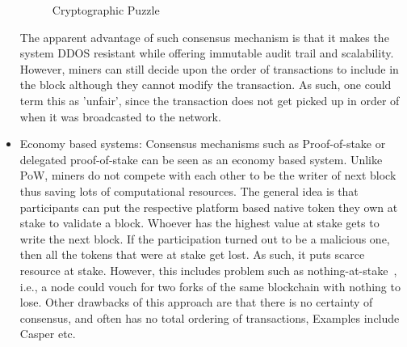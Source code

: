 \begin{itemize}
\begin{figure}
\begin{center}
			\caption{Cryptographic Puzzle}
			\label{fig:cryptographicPuzzle}
			\end{center}
		\end{figure}
		The apparent advantage of such consensus mechanism is that it makes the
		system DDOS resistant while offering immutable audit trail and
		scalability.  However, miners can still decide upon the order of
		transactions to include in the block although they cannot modify the
		transaction. As such, one could term this as 'unfair', since the
		transaction does not get picked up in order of when it was broadcasted
		to the network. 
	\item Economy based systems: Consensus mechanisms such as Proof-of-stake or
		delegated proof-of-stake can be seen as an economy based system. Unlike
		PoW, miners do not compete with each other to be the writer of next
		block thus saving lots of computational resources. The general idea is
		that participants can put the respective platform based native token
		they own at stake to validate a block. Whoever has the highest value at
		stake gets to write the next block. If the participation turned out to
		be a malicious one, then all the tokens that were at stake get lost. As
		such, it puts scarce resource at stake. However, this includes problem
		such as nothing-at-stake~\cite{houy2014will}, i.e., a node could vouch for two forks
		of the same blockchain with nothing to lose. Other drawbacks of this
		approach are that there is no certainty of consensus, and often has no
		total ordering of transactions, Examples include Casper etc. 
\end{itemize}

